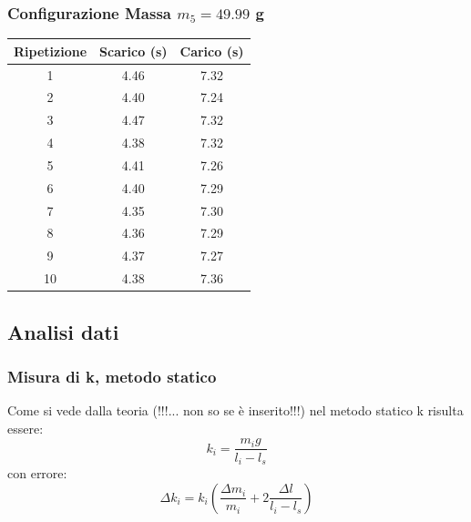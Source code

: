 \documentclass[a4paper,12pt]{article}
\begin{document}
\subsubsection*{Configurazione Massa $m_5 = 49.99$ g}
\noindent
\begin{minipage}[c]{0.45\textwidth}
\centering
\small
\begin{tabular}{ccc}
\hline
\textbf{Ripetizione} & \textbf{Scarico (s)} & \textbf{Carico (s)} \\ \hline
1  & 4.46 & 7.32 \\
2  & 4.40 & 7.24 \\
3  & 4.47 & 7.32 \\
4  & 4.38 & 7.32 \\
5  & 4.41 & 7.26 \\
6  & 4.40 & 7.29 \\
7  & 4.35 & 7.30 \\
8  & 4.36 & 7.29 \\
9  & 4.37 & 7.27 \\
10 & 4.38 & 7.36 \\ \hline
\end{tabular}
\label{tab:dinamica_massa5}
\end{minipage}
\hfill
\begin{minipage}[c]{0.50\textwidth}
\centering
{}
\label{fig:isto_massa5}
\end{minipage}

\subsection{Analisi dati}
\subsubsection*{Misura di k, metodo statico}
Come si vede dalla teoria (!!!... non so se è inserito!!!) nel metodo statico k risulta essere:
$$k_i = \frac{m_ig}{l_i-l_s}$$
con errore:
$$\Delta k_i = k_i(\frac{\Delta m_i}{m_i} + 2\frac{\Delta l}{l_i-l_s})$$
\end{document}
